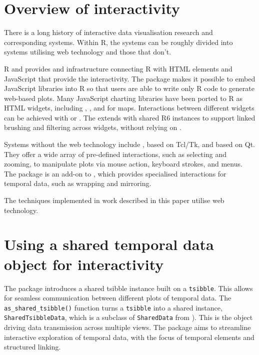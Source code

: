 \hypertarget{overview-of-interactivity}{%
\section{Overview of interactivity}\label{overview-of-interactivity}}

There is a long history of interactive data visualisation research and
corresponding systems. Within R, the systems can be roughly divided into
systems utilising web technology and those that don't.

R  \citep{R-shiny} and 
\citep{R-htmlwidgets} provides and infrastructure connecting R with HTML
elements and JavaScript that provide the interactivity. The
 package makes it possible to embed JavaScript
libraries into R so that users are able to write only R code to generate
web-based plots. Many JavaScript charting libraries have been ported to
R as HTML widgets, including  \citep{plotly2020},
 \citep{R-rbokeh}, and 
\citep{R-leaflet} for maps. Interactions between different widgets can
be achieved with  or 
\citep{R-crosstalk}. The  extends
 with shared R6 instances to support linked
brushing and filtering across widgets, without relying on
.

Systems without the web technology include 
\citep{R-loon}, based on Tcl/Tk, and 
\citep{xie_reactive_2014} based on Qt. They offer a wide array of
pre-defined interactions, such as selecting and zooming, to manipulate
plots via mouse action, keyboard strokes, and menus. The
 package \citep{cheng_enabling_2016} is an add-on to
, which provides specialised interactions for temporal
data, such as wrapping and mirroring.

The techniques implemented in work described in this paper utilise web
technology.

\hypertarget{using-a-shared-temporal-data-object-for-interactivity}{%
\section{Using a shared temporal data object for
interactivity}\label{using-a-shared-temporal-data-object-for-interactivity}}

The  package introduces a shared tsibble instance
built on a \texttt{tsibble}. This allows for seamless communication
between different plots of temporal data. The
\texttt{as\_shared\_tsibble()} function turns a \texttt{tsibble} into a
shared instance, \texttt{SharedTsibbleData}, which is a subclass of
\texttt{SharedData} from ). This is the object
driving data transmission across multiple views. The
 package aims to streamline interactive exploration
of temporal data, with the focus of temporal elements and structured
linking.


